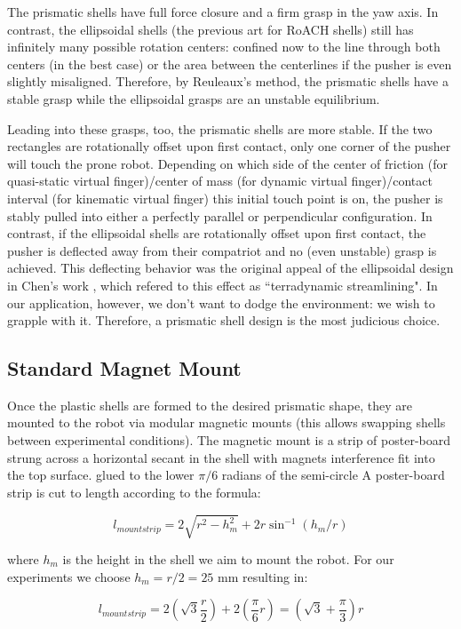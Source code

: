 \documentclass[letterpaper]{report}
\begin{document}
The prismatic shells have full force closure and a firm grasp in the yaw axis.
In contrast, the ellipsoidal shells (the previous art for RoACH shells) still has infinitely many possible rotation centers: confined now to the line through both centers (in the best case) or the area between the centerlines if the pusher is even slightly misaligned.
Therefore, by Reuleaux's method, the prismatic shells have a stable grasp while the ellipsoidal grasps are an unstable equilibrium.

Leading into these grasps, too, the prismatic shells are more stable.
If the two rectangles are rotationally offset upon first contact, only one corner of the pusher will touch the prone robot.
Depending on which side of the center of friction (for quasi-static virtual finger)/center of mass (for dynamic virtual finger)/contact interval (for kinematic virtual finger) this initial touch point is on, the pusher is stably pulled into either a perfectly parallel or perpendicular configuration.
In contrast, if the ellipsoidal shells are rotationally offset upon first contact, the pusher is deflected away from their compatriot and no (even unstable) grasp is achieved.
This deflecting behavior was the original appeal of the ellipsoidal design in Chen's work \cite{ChenTerradynamic}, which refered to this effect as ``terradynamic streamlining".
In our application, however, we don't want to dodge the environment: we wish to grapple with it.
Therefore, a prismatic shell design is the most judicious choice.

\subsection{Standard Magnet Mount}
Once the plastic shells are formed to the desired prismatic shape, they are mounted to the robot via modular magnetic mounts (this allows swapping shells between experimental conditions).
The magnetic mount is a strip of poster-board strung across a horizontal secant in the shell with magnets interference fit into the top surface.
glued to the lower $\pi/6$ radians of the semi-circle
A poster-board strip is cut to length according to the formula:

$$
l_{mountstrip} = 2 \sqrt{r^2 - h_m^2} + 2 r \sin^{-1}(h_m/r)
$$

where $h_m$ is the height in the shell we aim to mount the robot.
For our experiments we choose $h_m = r/2 = 25$ mm resulting in:

$$
l_{mountstrip} = 2 (\sqrt{3} \frac{r}{2}) + 2 (\frac{\pi}{6} r) = (\sqrt{3} + \frac{\pi}{3} ) r
$$
\end{document}
